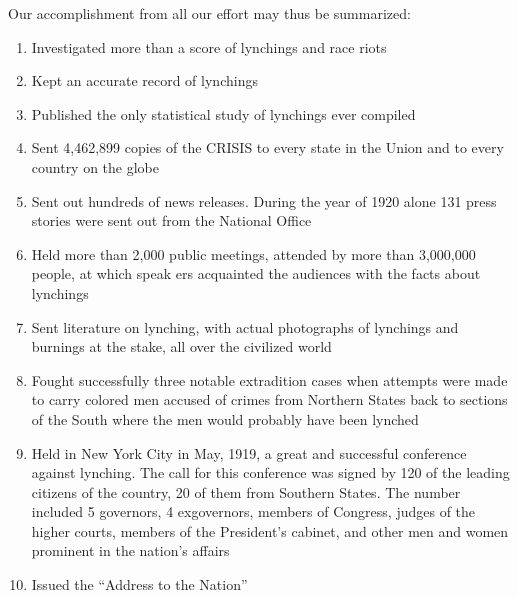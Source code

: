 \documentclass[letterpaper,10pt,english]{jupyterBook}
\begin{document}
\sphinxAtStartPar
Our accomplishment from all our effort may thus be summarized:
\begin{enumerate}
%
\item {} 
\sphinxAtStartPar
Investigated more than a score of lynchings and race riots

\item {} 
\sphinxAtStartPar
Kept an accurate record of lynchings

\item {} 
\sphinxAtStartPar
Published the only statistical study of lynchings ever compiled

\item {} 
\sphinxAtStartPar
Sent 4,462,899 copies of the CRISIS to every state in the Union and to every country on the globe

\item {} 
\sphinxAtStartPar
Sent out hundreds of news releases. During the year of 1920 alone 131 press stories were sent out from the National Office

\item {} 
\sphinxAtStartPar
Held more than 2,000 public meetings, attended by more than 3,000,000 people, at which speak­ ers acquainted the audiences with the facts about lynchings

\item {} 
\sphinxAtStartPar
Sent literature on lynching, with actual photographs of lynchings and burnings at the stake, all over the civilized world

\item {} 
\sphinxAtStartPar
Fought successfully three notable extradition cases when attempts were made to carry colored men accused of crimes from Northern States back to sections of the South where the men would probably have been lynched

\item {} 
\sphinxAtStartPar
Held in New York City in May, 1919, a great and successful conference against lynching. The call for this conference was signed by 120 of the leading citizens of the country, 20 of them from Southern States. The number included 5 governors, 4 ex\sphinxhyphen{}governors, members of Congress, judges of the higher courts, members of the President’s cabinet, and other men and women prominent in the nation’s affairs

\item {} 
\sphinxAtStartPar
Issued the “Address to the Nation”


\end{enumerate}
\end{document}
